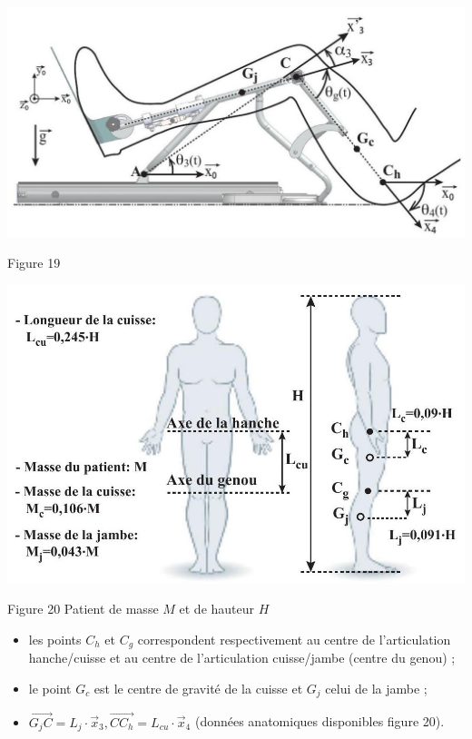 \documentclass[10pt]{article}
\begin{document}
\begin{center}
\includegraphics[max width=\textwidth]{2024_07_14_a83aebba33898893d39fg-12}
\end{center}

Figure 19

\begin{center}
\includegraphics[max width=\textwidth]{2024_07_14_a83aebba33898893d39fg-12(1)}
\end{center}

Figure 20 Patient de masse $M$ et de hauteur $H$

\begin{itemize}
  \item les points $C_{h}$ et $C_{g}$ correspondent respectivement au centre de l'articulation hanche/cuisse et au centre de l'articulation cuisse/jambe (centre du genou) ;

  \item le point $G_{c}$ est le centre de gravité de la cuisse et $G_{j}$ celui de la jambe ;

  \item $\overrightarrow{G_{j} C}=L_{j} \cdot \vec{x}_{3}, \overrightarrow{C C_{h}}=L_{c u} \cdot \vec{x}_{4}$ (données anatomiques disponibles figure 20).

\end{itemize}
\end{document}
